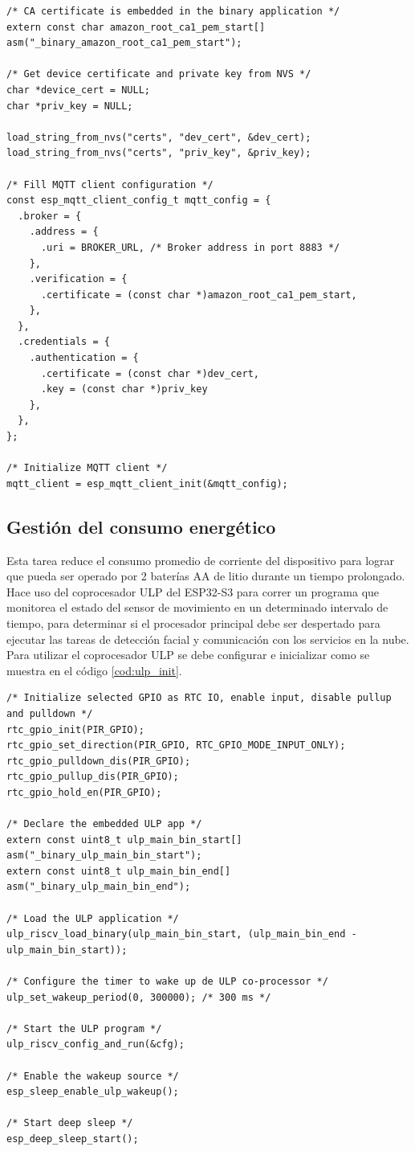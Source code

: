 \begin{lstlisting}[label=cod:mqtt_client,caption=Código para inicializar MQTT en modo cliente.]
/* CA certificate is embedded in the binary application */
extern const char amazon_root_ca1_pem_start[] asm("_binary_amazon_root_ca1_pem_start");

/* Get device certificate and private key from NVS */
char *device_cert = NULL;
char *priv_key = NULL;

load_string_from_nvs("certs", "dev_cert", &dev_cert);
load_string_from_nvs("certs", "priv_key", &priv_key);

/* Fill MQTT client configuration */
const esp_mqtt_client_config_t mqtt_config = {
  .broker = {
    .address = {
      .uri = BROKER_URL, /* Broker address in port 8883 */
    },
	.verification = {
      .certificate = (const char *)amazon_root_ca1_pem_start,
    },
  },
  .credentials = {
    .authentication = {
      .certificate = (const char *)dev_cert,
      .key = (const char *)priv_key
    },
  },
};

/* Initialize MQTT client */
mqtt_client = esp_mqtt_client_init(&mqtt_config);
\end{lstlisting}

\subsection{Gestión del consumo energético}
Esta tarea reduce el consumo promedio de corriente del dispositivo para lograr que pueda ser operado por 2 baterías AA de litio durante un tiempo prolongado. Hace uso del coprocesador ULP del ESP32-S3 para correr un programa que monitorea el estado del sensor de movimiento en un determinado intervalo de tiempo, para determinar si el procesador principal debe ser despertado para ejecutar las tareas de detección facial y comunicación con los servicios en la nube. Para utilizar el coprocesador ULP se debe configurar e inicializar como se muestra en el código \ref{cod:ulp_init}.

\begin{lstlisting}[label=cod:ulp_init,caption=Código para inicializar el coprocesador ULP.]
/* Initialize selected GPIO as RTC IO, enable input, disable pullup and pulldown */
rtc_gpio_init(PIR_GPIO);
rtc_gpio_set_direction(PIR_GPIO, RTC_GPIO_MODE_INPUT_ONLY);
rtc_gpio_pulldown_dis(PIR_GPIO);
rtc_gpio_pullup_dis(PIR_GPIO);
rtc_gpio_hold_en(PIR_GPIO);

/* Declare the embedded ULP app */
extern const uint8_t ulp_main_bin_start[] asm("_binary_ulp_main_bin_start");
extern const uint8_t ulp_main_bin_end[]   asm("_binary_ulp_main_bin_end");

/* Load the ULP application */
ulp_riscv_load_binary(ulp_main_bin_start, (ulp_main_bin_end - ulp_main_bin_start));

/* Configure the timer to wake up de ULP co-processor */
ulp_set_wakeup_period(0, 300000); /* 300 ms */

/* Start the ULP program */
ulp_riscv_config_and_run(&cfg);

/* Enable the wakeup source */
esp_sleep_enable_ulp_wakeup();

/* Start deep sleep */
esp_deep_sleep_start();
\end{lstlisting}

